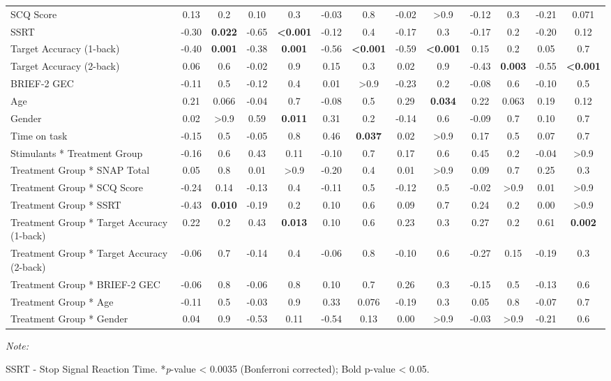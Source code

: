 \documentclass[
  letterpaper,
]{ut-thesis}
\begin{document}
\begin{landscape}
\begin{table}
{\begin{threeparttable}
{\begin{tabular}{lcccccccccccc}
SCQ Score & 0.13 & 0.2 & 0.10 & 0.3 & -0.03 & 0.8 & -0.02 & >0.9 & -0.12 & 0.3 & -0.21 & 0.071\\
SSRT & -0.30 & \textbf{0.022} & -0.65 & \textbf{<0.001} & -0.12 & 0.4 & -0.17 & 0.3 & -0.17 & 0.2 & -0.20 & 0.12\\
Target Accuracy (1-back) & -0.40 & \textbf{0.001} & -0.38 & \textbf{0.001} & -0.56 & \textbf{<0.001} & -0.59 & \textbf{<0.001} & 0.15 & 0.2 & 0.05 & 0.7\\
Target Accuracy (2-back) & 0.06 & 0.6 & -0.02 & 0.9 & 0.15 & 0.3 & 0.02 & 0.9 & -0.43 & \textbf{0.003} & -0.55 & \textbf{<0.001}\\
BRIEF-2 GEC & -0.11 & 0.5 & -0.12 & 0.4 & 0.01 & >0.9 & -0.23 & 0.2 & -0.08 & 0.6 & -0.10 & 0.5\\
Age & 0.21 & 0.066 & -0.04 & 0.7 & -0.08 & 0.5 & 0.29 & \textbf{0.034} & 0.22 & 0.063 & 0.19 & 0.12\\
Gender & 0.02 & >0.9 & 0.59 & \textbf{0.011} & 0.31 & 0.2 & -0.14 & 0.6 & -0.09 & 0.7 & 0.10 & 0.7\\
Time on task & -0.15 & 0.5 & -0.05 & 0.8 & 0.46 & \textbf{0.037} & 0.02 & >0.9 & 0.17 & 0.5 & 0.07 & 0.7\\
Stimulants * Treatment Group & -0.16 & 0.6 & 0.43 & 0.11 & -0.10 & 0.7 & 0.17 & 0.6 & 0.45 & 0.2 & -0.04 & >0.9\\
Treatment Group * SNAP Total & 0.05 & 0.8 & 0.01 & >0.9 & -0.20 & 0.4 & 0.01 & >0.9 & 0.09 & 0.7 & 0.25 & 0.3\\
Treatment Group * SCQ Score & -0.24 & 0.14 & -0.13 & 0.4 & -0.11 & 0.5 & -0.12 & 0.5 & -0.02 & >0.9 & 0.01 & >0.9\\
Treatment Group * SSRT & -0.43 & \textbf{0.010} & -0.19 & 0.2 & 0.10 & 0.6 & 0.09 & 0.7 & 0.24 & 0.2 & 0.00 & >0.9\\
Treatment Group * Target Accuracy (1-back) & 0.22 & 0.2 & 0.43 & \textbf{0.013} & 0.10 & 0.6 & 0.23 & 0.3 & 0.27 & 0.2 & 0.61 & \textbf{0.002}\\
Treatment Group * Target Accuracy (2-back) & -0.06 & 0.7 & -0.14 & 0.4 & -0.06 & 0.8 & -0.10 & 0.6 & -0.27 & 0.15 & -0.19 & 0.3\\
Treatment Group * BRIEF-2 GEC & -0.06 & 0.8 & -0.06 & 0.8 & 0.10 & 0.7 & 0.26 & 0.3 & -0.15 & 0.5 & -0.13 & 0.6\\
Treatment Group * Age & -0.11 & 0.5 & -0.03 & 0.9 & 0.33 & 0.076 & -0.19 & 0.3 & 0.05 & 0.8 & -0.07 & 0.7\\
Treatment Group * Gender & 0.04 & 0.9 & -0.53 & 0.11 & -0.54 & 0.13 & 0.00 & >0.9 & -0.03 & >0.9 & -0.21 & 0.6\\
\bottomrule
\end{tabular}}
\begin{tablenotes}[para]
\item \textit{Note: } 
\item SSRT - Stop Signal Reaction Time. *\textit{p}-value < 0.0035 (Bonferroni corrected); Bold p-value < 0.05.
\end{tablenotes}
\end{threeparttable}

}
\end{table}
\end{landscape}
\end{document}
